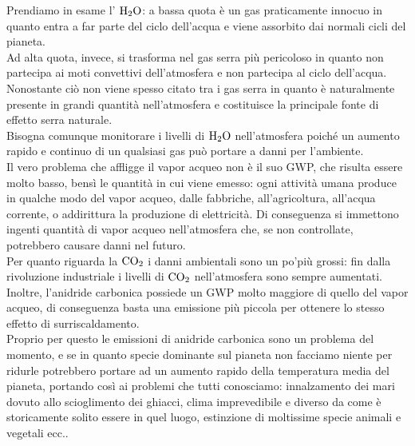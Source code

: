 Prendiamo in esame l' $\ce{H2O}$: a bassa quota è un gas praticamente innocuo in quanto entra a far parte del ciclo dell'acqua e viene assorbito dai normali cicli del pianeta.\\
Ad alta quota, invece, si trasforma nel gas serra più pericoloso in quanto non partecipa ai moti convettivi dell'atmosfera e non partecipa al ciclo dell'acqua.\\
Nonostante ciò non viene spesso citato tra i gas serra in quanto è naturalmente presente in grandi quantità nell'atmosfera e costituisce la principale fonte di effetto serra naturale.\\
Bisogna comunque monitorare i livelli di $\ce{H2O}$ nell'atmosfera poiché un aumento rapido e continuo di un qualsiasi gas può portare a danni per l'ambiente.\\
Il vero problema che affligge il vapor acqueo non è il suo GWP, che risulta essere molto basso, bensì le quantità in cui viene emesso: ogni attività umana produce in qualche modo del vapor acqueo, dalle fabbriche, all'agricoltura, all'acqua corrente, o addirittura la produzione di elettricità. Di conseguenza si immettono ingenti quantità di vapor acqueo nell'atmosfera che, se non controllate, potrebbero causare danni nel futuro.\\
Per quanto riguarda la $\ce{CO2}$ i danni ambientali sono un po'più grossi: fin dalla rivoluzione industriale i livelli di $\ce{CO2}$ nell'atmosfera sono sempre aumentati. Inoltre, l'anidride carbonica possiede un GWP molto maggiore di quello del vapor acqueo, di conseguenza basta una emissione più piccola per ottenere lo stesso effetto di surriscaldamento.\\
Proprio per questo le emissioni di anidride carbonica sono un problema del momento, e se in quanto specie dominante sul pianeta non facciamo niente per ridurle potrebbero portare ad un aumento rapido della temperatura media del pianeta, portando così ai problemi che tutti conosciamo: innalzamento dei mari dovuto allo scioglimento dei ghiacci, clima imprevedibile e diverso da come è storicamente solito essere in quel luogo, estinzione di moltissime specie animali e vegetali ecc..\\

